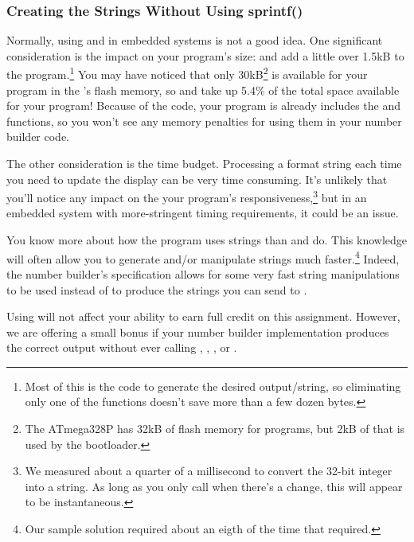 \subsubsection{Creating the Strings Without Using sprintf()}

Normally, using  and  in embedded systems is not a good idea.
One significant consideration is the impact on your program's size:  and  add a little over 1.5kB to the program.\footnote{
    Most of this is the code to generate the desired output/string, so eliminating only one of the functions doesn't save more than a few dozen bytes.
}
You may have noticed that only 30kB\footnote{
    The ATmega328P has 32kB of flash memory for programs, but 2kB of that is used by the bootloader.
} is available for your program in the \developmentboard's flash memory, so  and  take up 5.4\% of the total space available for your program!
Because of the  code, your program is already includes the  and  functions, so you won't see any memory penalties for using them in your number builder code.

The other consideration is the time budget.
Processing a format string each time you need to update the display can be very time consuming.
It's unlikely that you'll notice any impact on the your program's responsiveness,\footnote{
    We measured  about a quarter of a millisecond to convert the 32-bit integer into a string.
    As long as you only call  when there's a change, this will appear to be instantaneous.
} but in an embedded system with more-stringent timing requirements, it could be an issue.

You know more about how the program uses strings than  and  do.
This knowledge will often allow you to generate and/or manipulate strings much faster.\footnote{
    Our sample solution required about an eigth of the time that  required.
} Indeed, the number builder's specification allows for some very fast string manipulations to be used instead of  to produce the strings you can send to .

Using  will not affect your ability to earn full credit on this assignment.
However, we are offering a small bonus if your number builder implementation produces the correct output without ever calling , , , or .


